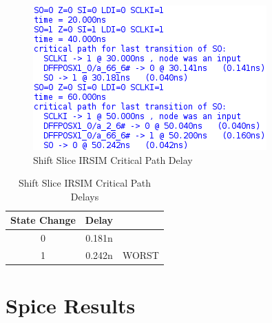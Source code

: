         \begin{figure}[H]
            \centering
            \includegraphics[]{../../irsim/shift_slice_timing.png}
            \caption{Shift Slice IRSIM Critical Path Delay}
        \end{figure}
        \begin{table}[H]
            \centering
            \begin{tabular}{crc}
                \toprule
                \textbf{State Change} & \textbf{Delay} & \\
                \midrule
                0 & 0.181n & \\
                1 & 0.242n & WORST \\
                \bottomrule
            \end{tabular}
            \caption{Shift Slice IRSIM Critical Path Delays}
        \end{table}


\newpage
\section{Spice Results}

